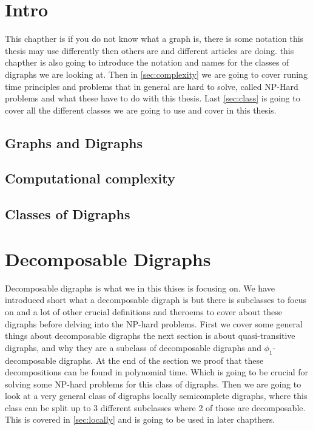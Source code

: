 
\chapter{Intro}
This chapther is if you do not know what a graph is, there is some notation this thesis may use differently then others are and different articles are doing. this chapther is also going to introduce the notation and names for the classes of digraphs we are looking at. Then in \autoref{sec:complexity} we are going to cover runing time principles and problems that in general are hard to solve, called NP-Hard problems and what these have to do with this thesis. Last \autoref{sec:class} is going to cover all the different classes we are going to use and cover in this thesis.
\label{chap:intro}
\section{Graphs and Digraphs}
\label{sec:digraph}

\section{Computational complexity}
\label{sec:complexity}

\section{Classes of Digraphs}
\label{sec:class}


\chapter{Decomposable Digraphs}
\label{chap:decomposable}
Decomposable digraphs is what we in this thises is focusing on. 
We have introduced short what a decomposable digraph is but there is subclasses to focus on and a lot of other crucial definitions and theroems to cover about these digraphs before delving into the NP-hard problems. First we cover some general things about decomposable digraphs the next section is about quasi-transitive digraphs, and why they are a subclass of decomposable digraphs and $\phi_1$-decomposable digraphs. At the end of the section we proof that these decompositions can be found in polynomial time. Which is going to be crucial for solving some NP-hard problems for this class of digraphs. Then we are going to look at a very general class of digraphs locally semicomplete digraphs, where this class can be split up to 3 different subclasses where 2 of those are decomposable. This is covered in \autoref{sec:locally} and is going to be used in later chapthers. 
